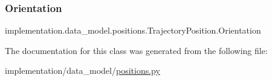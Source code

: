\subsubsection{\texorpdfstring{Orientation}{Orientation}}
{\footnotesize\ttfamily implementation.\+data\+\_\+model.\+positions.\+Trajectory\+Position.\+Orientation\hspace{0.3cm}{\ttfamily [static]}}



The documentation for this class was generated from the following file\+:\begin{DoxyCompactItemize}
\item 
implementation/data\+\_\+model/\hyperlink{positions_8py}{positions.\+py}\end{DoxyCompactItemize}
